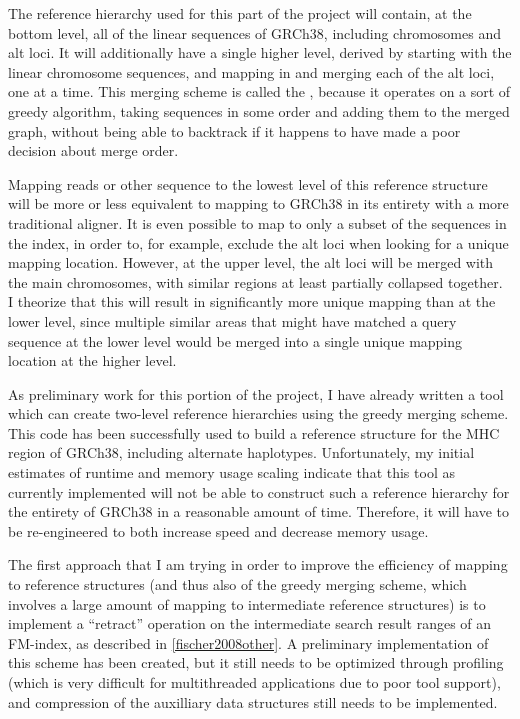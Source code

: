\documentclass[11pt,proposal]{ucthesis}
\begin{document}
The reference hierarchy used for this part of the project will contain, at the bottom level, all of the linear sequences of GRCh38, including chromosomes and alt loci. It will additionally have a single higher level, derived by starting with the linear chromosome sequences, and mapping in and merging each of the alt loci, one at a time. This merging scheme is called the , because it operates on a sort of greedy algorithm, taking sequences in some order and adding them to the merged graph, without being able to backtrack if it happens to have made a poor decision about merge order.

Mapping reads or other sequence to the lowest level of this reference structure will be more or less equivalent to mapping to GRCh38 in its entirety with a more traditional aligner. It is even possible to map to only a subset of the sequences in the index, in order to, for example, exclude the alt loci when looking for a unique mapping location. However, at the upper level, the alt loci will be merged with the main chromosomes, with similar regions at least partially collapsed together. I theorize that this will result in significantly more unique mapping than at the lower level, since multiple similar areas that might have matched a query sequence at the lower level would be merged into a single unique mapping location at the higher level.

As preliminary work for this portion of the project, I have already written a tool which can create two-level reference hierarchies using the greedy merging scheme. This code has been successfully used to build a reference structure for the MHC region of GRCh38, including alternate haplotypes. Unfortunately, my initial estimates of runtime and memory usage scaling indicate that this tool as currently implemented will not be able to construct such a reference hierarchy for the entirety of GRCh38 in a reasonable amount of time. Therefore, it will have to be re-engineered to both increase speed and decrease memory usage.

The first approach that I am trying in order to improve the efficiency of mapping to reference structures (and thus also of the greedy merging scheme, which involves a large amount of mapping to intermediate reference structures) is to implement a ``retract'' operation on the intermediate search result ranges of an FM-index, as described in \ref{fischer2008other}. A preliminary implementation of this scheme has been created, but it still needs to be optimized through profiling (which is very difficult for multithreaded applications due to poor tool support), and compression of the auxilliary data structures still needs to be implemented.
\end{document}
